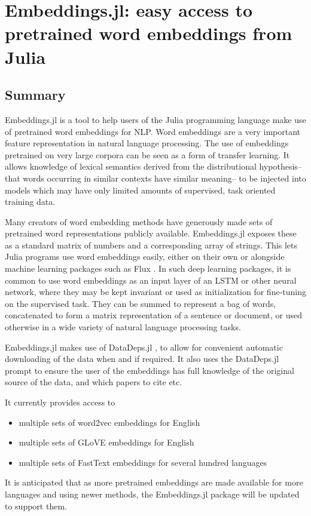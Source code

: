 \documentclass{book}
\begin{document}
\chapter{Embeddings.jl: easy access to pretrained word embeddings from Julia}

\hypertarget{summary}{%
\section{Summary}}

Embeddings.jl is a tool to help users of the Julia programming language
\citep{Julia} make use of pretrained word embeddings for NLP. Word
embeddings are a very important feature representation in natural
language processing. The use of embeddings pretrained on very large
corpora can be seen as a form of transfer learning. It allows knowledge
of lexical semantics derived from the distributional hypothesis-- that
words occurring in similar contexts have similar meaning-- to be
injected into models which may have only limited amounts of supervised,
task oriented training data.

Many creators of word embedding methods have generously made sets of
pretrained word representations publicly available. Embeddings.jl
exposes these as a standard matrix of numbers and a corresponding array
of strings. This lets Julia programs use word embeddings easily, either
on their own or alongside machine learning packages such as Flux
\citep{flux}. In such deep learning packages, it is common to use word
embeddings as an input layer of an LSTM or other neural network, where
they may be kept invariant or used as initialization for fine-tuning on
the supervised task. They can be summed to represent a bag of words,
concatenated to form a matrix representation of a sentence or document,
or used otherwise in a wide variety of natural language processing
tasks.

Embeddings.jl makes use of DataDeps.jl \citep{2018arXiv180801091W}, to allow for
convenient automatic downloading of the data when and if required. It
also uses the DataDeps.jl prompt to ensure the user of the embeddings
has full knowledge of the original source of the data, and which papers
to cite etc.

It currently provides access to

\begin{itemize}
	\item
	multiple sets of word2vec embeddings \citep{mikolov2013efficient} for English
	\item
	multiple sets of GLoVE \citep{pennington2014glove} embeddings for English
	\item
	multiple sets of FastText embeddings \citep{bojanowski2016enriching,fasttext157lang}
	for several hundred languages
\end{itemize}

It is anticipated that as more pretrained embeddings are made available
for more languages and using newer methods, the Embeddings.jl package
will be updated to support them.
\end{document}

